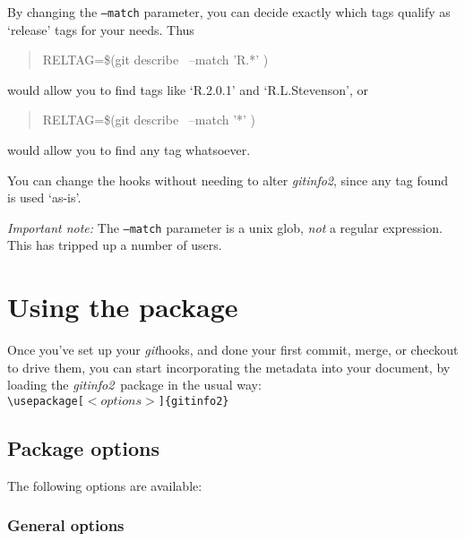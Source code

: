 \documentclass[a4paper,12pt,twoside,openany]{memoir}
\newcommand{\sfit}[1]{\textit{#1}}
\newcommand{\git}{\sfit{git}}
\newcommand{\tpname}{\sfit{gitinfo2}}
\begin{document}
By changing the \texttt{--match} parameter, you can decide exactly which tags
qualify as `release' tags for your needs. Thus

\begin{quotation}
{\ttfamily
RELTAG=\$(git describe \textellipsis\ --match 'R.*' \textellipsis)
}
\end{quotation}
would allow you to find tags like `R.2.0.1' and `R.L.Stevenson',
or

\begin{quotation}
{\ttfamily
RELTAG=\$(git describe \textellipsis\ --match '*' \textellipsis)
}
\end{quotation}
would allow you to find any tag whatsoever.

You can change the hooks without needing to alter \tpname,
since any tag found is used `as-is'.

\emph{Important note:} The \texttt{--match} parameter is a unix glob, 
\emph{not} a regular expression. This has tripped up a number of users.

\chapter{Using the package}
\label{ch:using}
Once you've set up your \git hooks, and done your first commit,
merge, or checkout to drive them,
you can start incorporating the metadata into your document,
by loading the \tpname\ package in the usual way:\\[0.5\baselineskip]
\texttt{\textbackslash usepackage[$<options>$]\{gitinfo2\}}

\section{Package options}

The following options are available:

\subsection{General options}
\end{document}
